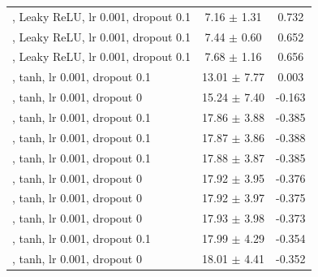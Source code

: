 \documentclass[journal,article,submit,pdftex,moreauthors]{Definitions/mdpi}
\begin{document}
\begin{center}
\begin{longtable}{@{}p{8.2cm} c c@{}}
\quad [64, 32, 16], Leaky ReLU, lr 0.001, dropout 0.1 & 7.16 $\pm$ 1.31 & 0.732 \\
\quad [128, 64, 32, 16, 8], Leaky ReLU, lr 0.001, dropout 0.1 & 7.44 $\pm$ 0.60 & 0.652 \\
\quad [64, 32, 16, 8], Leaky ReLU, lr 0.001, dropout 0.1 & 7.68 $\pm$ 1.16 & 0.656 \\
\quad [128, 64, 32], tanh, lr 0.001, dropout 0.1 & 13.01 $\pm$ 7.77 & 0.003 \\
\quad [128, 64, 32], tanh, lr 0.001, dropout 0 & 15.24 $\pm$ 7.40 & -0.163 \\
\quad [32, 16, 8], tanh, lr 0.001, dropout 0.1 & 17.86 $\pm$ 3.88 & -0.385 \\
\quad [64, 32, 16, 8], tanh, lr 0.001, dropout 0.1 & 17.87 $\pm$ 3.86 & -0.388 \\
\quad [128, 64, 32, 16, 8], tanh, lr 0.001, dropout 0.1 & 17.88 $\pm$ 3.87 & -0.385 \\
\quad [64, 32, 16, 8], tanh, lr 0.001, dropout 0 & 17.92 $\pm$ 3.95 & -0.376 \\
\quad [32, 16, 8], tanh, lr 0.001, dropout 0 & 17.92 $\pm$ 3.97 & -0.375 \\
\quad [128, 64, 32, 16, 8], tanh, lr 0.001, dropout 0 & 17.93 $\pm$ 3.98 & -0.373 \\
\quad [64, 32, 16], tanh, lr 0.001, dropout 0.1 & 17.99 $\pm$ 4.29 & -0.354 \\
\quad [64, 32, 16], tanh, lr 0.001, dropout 0 & 18.01 $\pm$ 4.41 & -0.352 \\
\midrule
\end{longtable}
\end{center}
\newpage
\end{document}
